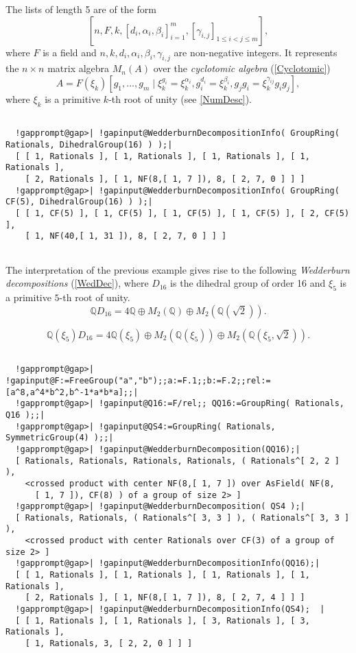 \documentclass[a4paper,11pt]{report}
\begin{document}
{{{ The lists of length 5 are of the form 
\[ [n,F,k,[d_i,\alpha_i,\beta_i]_{i=1}^m, [\gamma_{i,j}]_{1\le i < j \le m} ], \]
 where $F$ is a field and $n,k,d_i,\alpha_i,\beta_i,\gamma_{i,j}$ are non-negative integers. It represents the $n\times n$ matrix algebra $M_n(A)$ over the \emph{cyclotomic algebra} (\ref{Cyclotomic}) 
\[ A = F(\xi_k)[g_1,\ldots,g_m \mid \xi_k^{g_i} = \xi_k^{\alpha_i},
g_i^{d_i}=\xi_k^{\beta_i}, g_jg_i=\xi_k^{\gamma_{ij}} g_i g_j], \]
 where $\xi_k$ is a primitive $k$-th root of unity (see \ref{NumDesc}). 
\begin{Verbatim}[commandchars=!@|,fontsize=\small,frame=single,label=Example]
  
  !gapprompt@gap>| !gapinput@WedderburnDecompositionInfo( GroupRing( Rationals, DihedralGroup(16) ) );|
  [ [ 1, Rationals ], [ 1, Rationals ], [ 1, Rationals ], [ 1, Rationals ],
    [ 2, Rationals ], [ 1, NF(8,[ 1, 7 ]), 8, [ 2, 7, 0 ] ] ]
  !gapprompt@gap>| !gapinput@WedderburnDecompositionInfo( GroupRing( CF(5), DihedralGroup(16) ) );|
  [ [ 1, CF(5) ], [ 1, CF(5) ], [ 1, CF(5) ], [ 1, CF(5) ], [ 2, CF(5) ],
    [ 1, NF(40,[ 1, 31 ]), 8, [ 2, 7, 0 ] ] ]
  
\end{Verbatim}
 }

 The interpretation of the previous example gives rise to the following \emph{Wedderburn decompositions} (\ref{WedDec}), where $D_{16}$ is the dihedral group of order 16 and $\xi_5$ is a primitive $5$-th root of unity. 
\[ {\ensuremath{\mathbb Q}} D_{16} = 4 {\ensuremath{\mathbb Q}} \oplus M_2(
{\ensuremath{\mathbb Q}} ) \oplus M_2( {\ensuremath{\mathbb Q}} (\sqrt{2})). \]
 
\[ {\ensuremath{\mathbb Q}} (\xi_5) D_{16} = 4 {\ensuremath{\mathbb Q}} (\xi_5)
\oplus M_2( {\ensuremath{\mathbb Q}} (\xi_5)) \oplus M_2( {\ensuremath{\mathbb
Q}} (\xi_5,\sqrt{2})). \]
 
\begin{Verbatim}[commandchars=!@|,fontsize=\small,frame=single,label=Example]
  
  !gapprompt@gap>| !gapinput@F:=FreeGroup("a","b");;a:=F.1;;b:=F.2;;rel:=[a^8,a^4*b^2,b^-1*a*b*a];;|
  !gapprompt@gap>| !gapinput@Q16:=F/rel;; QQ16:=GroupRing( Rationals, Q16 );;|
  !gapprompt@gap>| !gapinput@QS4:=GroupRing( Rationals, SymmetricGroup(4) );;|
  !gapprompt@gap>| !gapinput@WedderburnDecomposition(QQ16);|
  [ Rationals, Rationals, Rationals, Rationals, ( Rationals^[ 2, 2 ] ),
    <crossed product with center NF(8,[ 1, 7 ]) over AsField( NF(8,
      [ 1, 7 ]), CF(8) ) of a group of size 2> ]
  !gapprompt@gap>| !gapinput@WedderburnDecomposition( QS4 );|
  [ Rationals, Rationals, ( Rationals^[ 3, 3 ] ), ( Rationals^[ 3, 3 ] ),
    <crossed product with center Rationals over CF(3) of a group of size 2> ]
  !gapprompt@gap>| !gapinput@WedderburnDecompositionInfo(QQ16);|
  [ [ 1, Rationals ], [ 1, Rationals ], [ 1, Rationals ], [ 1, Rationals ], 
    [ 2, Rationals ], [ 1, NF(8,[ 1, 7 ]), 8, [ 2, 7, 4 ] ] ]
  !gapprompt@gap>| !gapinput@WedderburnDecompositionInfo(QS4);  |
  [ [ 1, Rationals ], [ 1, Rationals ], [ 3, Rationals ], [ 3, Rationals ], 
    [ 1, Rationals, 3, [ 2, 2, 0 ] ] ]
  

\end{Verbatim}}}
\end{document}
